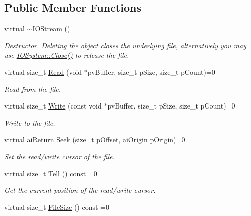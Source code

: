 \subsection*{Public Member Functions}
\begin{DoxyCompactItemize}
\item 
\hypertarget{class_assimp_1_1_i_o_stream_a6cedc5033bf531bf14b97d1c9b788de8}{virtual \hyperlink{class_assimp_1_1_i_o_stream_a6cedc5033bf531bf14b97d1c9b788de8}{$\sim$\-I\-O\-Stream} ()}\label{class_assimp_1_1_i_o_stream_a6cedc5033bf531bf14b97d1c9b788de8}

\begin{DoxyCompactList}\small\item\em Destructor. Deleting the object closes the underlying file, alternatively you may use \hyperlink{class_assimp_1_1_i_o_system_a8c334d60f04bceeb6bd0157d21723f3e}{I\-O\-System\-::\-Close()} to release the file. \end{DoxyCompactList}\item 
virtual size\-\_\-t \hyperlink{class_assimp_1_1_i_o_stream_ae376f641020989d61863b9c6f55c7abf}{Read} (void $\ast$pv\-Buffer, size\-\_\-t p\-Size, size\-\_\-t p\-Count)=0
\begin{DoxyCompactList}\small\item\em Read from the file. \end{DoxyCompactList}\item 
virtual size\-\_\-t \hyperlink{class_assimp_1_1_i_o_stream_ad0ca4aae1b8c4d00db391ac3a4171f7b}{Write} (const void $\ast$pv\-Buffer, size\-\_\-t p\-Size, size\-\_\-t p\-Count)=0
\begin{DoxyCompactList}\small\item\em Write to the file. \end{DoxyCompactList}\item 
virtual ai\-Return \hyperlink{class_assimp_1_1_i_o_stream_a5ed0dddf418ab08cf3fc21f3f3032220}{Seek} (size\-\_\-t p\-Offset, ai\-Origin p\-Origin)=0
\begin{DoxyCompactList}\small\item\em Set the read/write cursor of the file. \end{DoxyCompactList}\item 
virtual size\-\_\-t \hyperlink{class_assimp_1_1_i_o_stream_a316ac6cd16b5a493d1313f792c806194}{Tell} () const =0
\begin{DoxyCompactList}\small\item\em Get the current position of the read/write cursor. \end{DoxyCompactList}\item 
\hypertarget{class_assimp_1_1_i_o_stream_aaa01183d197fb714f28d6c611b6fa058}{virtual size\-\_\-t \hyperlink{class_assimp_1_1_i_o_stream_aaa01183d197fb714f28d6c611b6fa058}{File\-Size} () const =0}\label{class_assimp_1_1_i_o_stream_aaa01183d197fb714f28d6c611b6fa058}


\end{DoxyCompactItemize}
